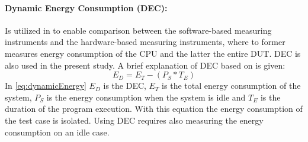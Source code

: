 \paragraph{Dynamic Energy Consumption (DEC):} Is utilized in \cite{fahad2019comparative,biksbois} to enable comparison between the software-based measuring instruments and the hardware-based measuring instruments, where to former measures energy consumption of the CPU and the latter the entire DUT. DEC is also used in the present study. A brief explanation of DEC based on \cite{fahad2019comparative} is given:
\begin{equation}\label{eq:dynamicEnergy}
    E_D = E_T - (P_S * T_E)
\end{equation}
In \cref{eq:dynamicEnergy} $E_D$ is the DEC, $E_T$ is the total energy consumption of the system, $P_S$ is the energy consumption when the system is idle and $T_E$ is the duration of the program execution. With this equation the energy consumption of the test case is isolated. Using DEC requires also measuring the energy consumption on an idle case. \cite{fahad2019comparative}
